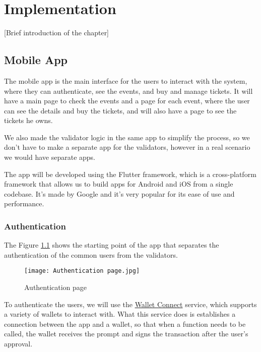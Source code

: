 \chapter{Implementation}
\label{ch:implementation}

[Brief introduction of the chapter]

\section{Mobile App}
\label{sec:mobile_app}

The mobile app is the main interface for the users to interact with the system,
where they can authenticate, see the events, and buy and manage tickets. It
will have a main page to check the events and a page for each event, where the
user can see the details and buy the tickets, and will also have a page to see
the tickets he owns.

We also made the validator logic in the same app to simplify the process, so we
don't have to make a separate app for the validators, however in a real
scenario we would have separate apps.

The app will be developed using the Flutter framework, which is a
cross-platform framework that allows us to build apps for Android and iOS from
a single codebase. It's made by Google and it's very popular for its ease of
use and performance.

\subsection{Authentication}
\label{subsec:authentication}

The Figure \ref{fig:authentication_page} shows the starting point of the app
that separates the authentication of the common users from the validators.

\begin{figure}[H]
	\texttt{[image: Authentication page.jpg]}
	\centering
	\caption{Authentication page}
	\label{fig:authentication_page}
\end{figure}

To authenticate the users, we will use the
\href{https://walletconnect.com/}{Wallet Connect} service, which supports a
variety of wallets to interact with. What this service does is establishes a
connection between the app and a wallet, so that when a function needs to be
called, the wallet receives the prompt and signs the transaction after the
user's approval.

